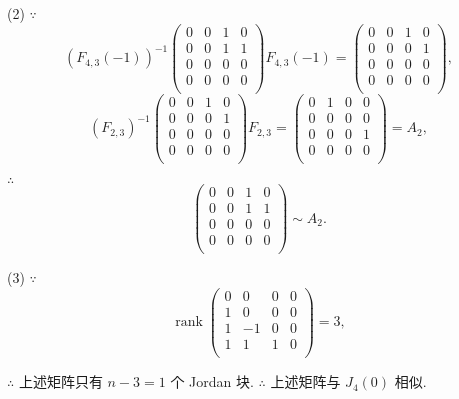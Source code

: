 \documentclass{ctexart}
\begin{document}
\begin{solution}
    (2) $\because$
    \[(F_{4,3}(-1))^{-1}\begin{pmatrix}
        0 & 0 & 1 & 0 \\
        0 & 0 & 1 & 1 \\
        0 & 0 & 0 & 0 \\
        0 & 0 & 0 & 0 \\
    \end{pmatrix}F_{4,3}(-1)=\begin{pmatrix}
        0 & 0 & 1 & 0 \\
        0 & 0 & 0 & 1 \\
        0 & 0 & 0 & 0 \\
        0 & 0 & 0 & 0 \\
    \end{pmatrix},\]
    \[(F_{2,3})^{-1}\begin{pmatrix}
        0 & 0 & 1 & 0 \\
        0 & 0 & 0 & 1 \\
        0 & 0 & 0 & 0 \\
        0 & 0 & 0 & 0 \\
    \end{pmatrix}F_{2,3}=\begin{pmatrix}
        0 & 1 & 0 & 0 \\
        0 & 0 & 0 & 0 \\
        0 & 0 & 0 & 1 \\
        0 & 0 & 0 & 0 \\
    \end{pmatrix}=A_2,\]

    $\therefore$
    \[\begin{pmatrix}
        0 & 0 & 1 & 0 \\
        0 & 0 & 1 & 1 \\
        0 & 0 & 0 & 0 \\
        0 & 0 & 0 & 0 \\
    \end{pmatrix}\sim A_2.\]

    (3) $\because$
    \[\operatorname{rank}\begin{pmatrix}
        0 & 0 & 0 & 0 \\
        1 & 0 & 0 & 0 \\
        1 & -1 & 0 & 0 \\
        1 & 1 & 1 & 0 \\
    \end{pmatrix}=3,\]

    $\therefore$ 上述矩阵只有 $n-3=1$ 个 Jordan 块. $\therefore$ 上述矩阵与 $J_4(0)$ 相似.


\end{solution}
\end{document}
